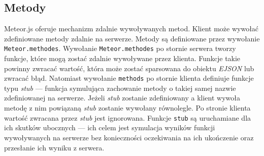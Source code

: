 \subsection{Metody}
Meteor.js oferuje mechanizm zdalnie wywoływanych metod. Klient może wywołać zdefiniowane metody zdalnie na serwerze. Metody są definiowane przez wywołanie \verb|Meteor.methodes|. Wywołanie \verb|Meteor.methodes| po stornie serwera tworzy funkcje, które mogą zostać zdalnie wywoływane przez klienta. Funkcje takie powinny zwracać wartość, która może zostać sparsowana do obiektu \textit{EJSON} lub zwracać błąd. Natomiast wywołanie \verb|methods| po stornie klienta definiuje funkcje typu \textit{stub} --- funkcja symulująca zachowanie metody o takiej samej nazwie  zdefiniowanej na serwerze. Jeżeli \textit{stub} zostanie zdefiniowany a klient wywoła metodę z nim powiązaną \textit{stub} zostanie wywołany równolegle. Po stronie klienta wartość zwracana przez \textit{stub} jest ignorowana. Funkcje \verb|stub| są uruchamiane dla ich skutków ubocznych --- ich celem jest symulacja wyników funkcji wywoływanych na serwerze bez konieczności oczekiwania na ich ukończenie oraz przesłanie ich wyniku z serwera.

